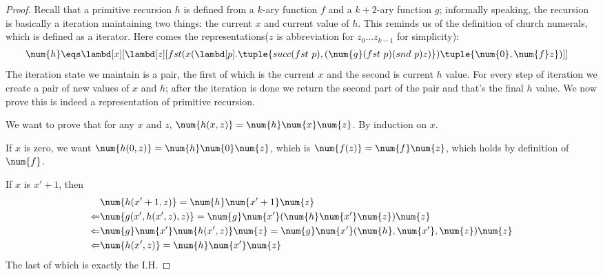 \documentclass[../../../include/open-logic-section]{subfiles}
\begin{document}
\begin{proof}
  Recall that a primitive recursion $h$ is defined from a $k$-ary function $f$ and a $k+2$-ary function
  $g$; informally speaking, the recursion is basically a iteration
  maintaining two things: the current $x$ and current value of $h$. This
  reminds us of the definition of church numerals, which is defined as a
  iterator. Here comes the representations($z$ is abbreviation for $z_0
  \dots z_{k-1}$ for simplicity):
  \begin{align*}
    \num{h} &\eqs \lambd[x][\lambd[z][fst (x (\lambd[p].\tuple{succ (fst ~ p),
              (\num{g} (fst ~ p) (snd ~ p) z)}) \tuple{\num{0}, \num{f} z})]]
  \end{align*}
  The iteration state we maintain is a pair, the first of which is the
  current $x$ and the second is current $h$ value. For every step of
  iteration we create a pair of new values of $x$ and $h$; after the
  iteration is done we return the second part of the pair and that's the
  final $h$ value. We now prove this is indeed a representation of
  primitive recursion.

  We want to prove that for any $x$ and $z$, $\num{h(x,z)} = \num{h}
  \num{x} \num{z}$. By induction on $x$.

  If $x$ is zero, we want $\num{h(0,z)} = \num{h} \num{0} \num{z}$,
  which is $\num{f(z)} = \num{f} \num{z}$, which holds by definition
  of $\num{f}$.
  
  If $x$ is $x'+1$, then
  \begin{align*}
    &\num{h(x'+1,z)} = \num{h} \num{x'+1} \num{z} \\
    \Leftarrow & \num{g(x',h(x',z),z)} = \num{g} \num{x'} (\num{h}
                 \num{x'} \num{z}) \num{z} \\
    \Leftarrow & \num{g} \num{x'} \num{h(x',z)} \num{z} = \num{g}
                 \num{x'} (\num{h}, \num{x'}, \num{z}) \num{z} \\
    \Leftarrow & \num{h(x',z)} = \num{h} \num{x'} \num{z}
  \end{align*}
  The last of which is exactly the I.H.
\end{proof}
\end{document}
